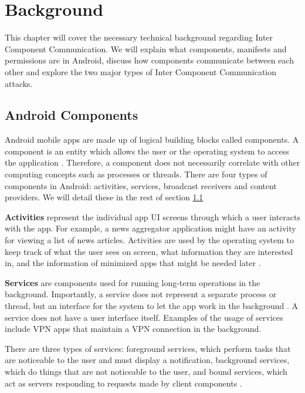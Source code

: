 \chapter{Background}
    \label{chap:background}

   This chapter will cover the necessary technical background regarding Inter Component Communication. We will explain what components, manifests and permissions are in Android, discuss how components communicate between each other and explore the two major types of Inter Component Communication attacks.
    
    \section{Android Components}
        \label{sec:android_components}
        
    Android mobile apps are made up of logical building blocks called components. A component is an entity which allows the user or the operating system to access the application \cite{android_app_fundamentals}. Therefore, a component does not necessarily correlate with other computing concepts such as processes or threads. There are four types of components in Android: activities, services, broadcast receivers and content providers. We will detail these in the rest of section \ref{sec:android_components}
        
    \textbf{Activities} represent the individual app UI screens through which a user interacts with the app. For example, a news aggregator application might have an activity for viewing a list of news articles. Activities are used by the operating system to keep track of what the user sees on screen, what information they are interested in, and the information of minimized apps that might be needed later \cite{android_app_fundamentals}.
        
    \textbf{Services} are components used for running long-term operations in the background. Importantly, a service does not represent a separate process or thread, but an interface for the system to let the app work in the background \cite{whats_is_a_service}. A service does not have a user interface itself. Examples of the usage of services include VPN apps that maintain a VPN connection in the background.
    
    There are three types of services: foreground services, which perform tasks that are noticeable to the user and must display a notification, background services, which do things that are not noticeable to the user, and bound services, which act as servers responding to requests made by client components \cite{services_overview}.
        

